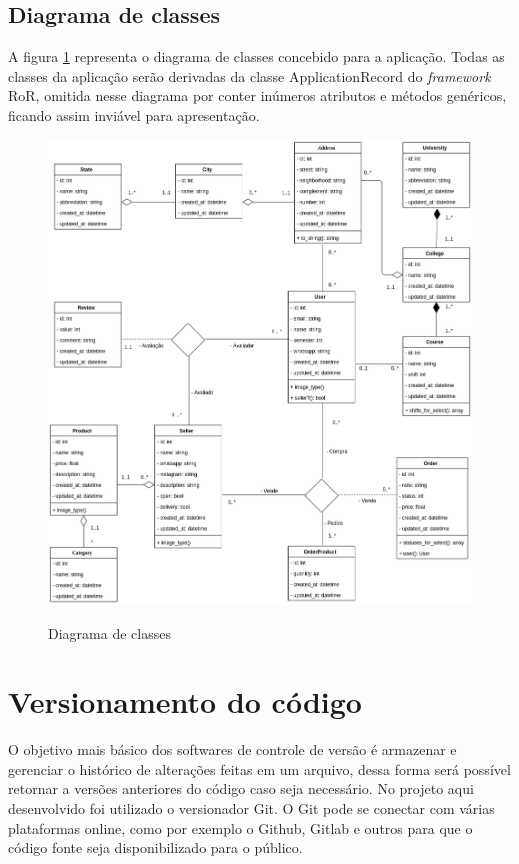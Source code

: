 \subsection{Diagrama de classes}
A figura \ref{fig:class} representa o diagrama de classes concebido para a aplicação. Todas as classes da aplicação serão derivadas da classe ApplicationRecord do \textit{framework} RoR, omitida nesse diagrama por conter inúmeros atributos e métodos genéricos, ficando assim inviável para apresentação.
\begin{figure}[htbp!]
  \centering
  \caption{Diagrama de classes}
  \includegraphics[width=1\textwidth]{figs/class.png}
    \label{fig:class}
\end{figure}

\section{Versionamento do código}
O objetivo mais básico dos softwares de controle de versão é armazenar e gerenciar o histórico de alterações feitas em um arquivo, dessa forma será possível retornar a versões anteriores do código caso seja necessário. No projeto aqui desenvolvido foi utilizado o versionador Git. O Git pode se conectar com várias plataformas online, como por exemplo o Github, Gitlab e outros para que o código fonte seja disponibilizado para o público.
